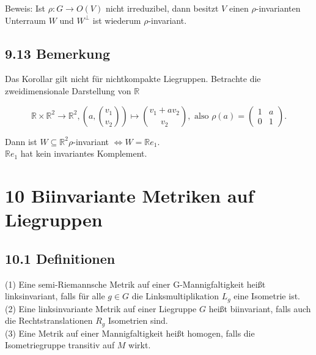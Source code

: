 \documentclass[10pt, letterpaper]{article}
\begin{document}
Beweis: Ist $\rho: G \rightarrow O(V)$ nicht irreduzibel, dann besitzt $V$ einen $\rho$-invarianten Unterraum $W$ und $W^{\perp}$ ist wiederum $\rho$-invariant.

\subsection*{9.13 Bemerkung}
Das Korollar gilt nicht für nichtkompakte Liegruppen. Betrachte die zweidimensionale Darstellung von $\mathbb{R}$

$$
\mathbb{R} \times \mathbb{R}^{2} \rightarrow \mathbb{R}^{2},\left(a,\binom{v_{1}}{v_{2}}\right) \mapsto\binom{v_{1}+a v_{2}}{v_{2}}, \text { also } \rho(a)=\left(\begin{array}{ll}
1 & a \\
0 & 1
\end{array}\right) .
$$

Dann ist $W \subseteq \mathbb{R}^{2} \rho$-invariant $\Leftrightarrow W=\mathbb{R} e_{1}$.\\
$\mathbb{R} e_{1}$ hat kein invariantes Komplement.

\section*{10 Biinvariante Metriken auf Liegruppen}
\subsection*{10.1 Definitionen}
(1) Eine semi-Riemannsche Metrik auf einer G-Mannigfaltigkeit heißt linksinvariant, falls für alle $g \in G$ die Linksmultiplikation $L_{g}$ eine Isometrie ist.\\
(2) Eine linksinvariante Metrik auf einer Liegruppe $G$ heißt biinvariant, falls auch die Rechtstranslationen $R_{g}$ Isometrien sind.\\
(3) Eine Metrik auf einer Mannigfaltigkeit heißt homogen, falls die Isometriegruppe transitiv auf $M$ wirkt.
\end{document}
